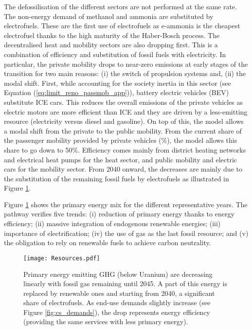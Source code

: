 The defossilisation of the different sectors are not performed at the same rate. The non-energy demand of methanol and ammonia are substituted by electrofuels. These are the first use of electrofuels as  e-ammonia is the cheapest electrofuel thanks to the high maturity of the Haber-Bosch process. The decentralised heat and mobility sectors are also dropping first. This is a combination of efficiency and substitution of fossil fuels with electricity. In particular, the private mobility drops to near-zero emissions at early stages of the transition for two main reasons: (i) the switch of propulsion systems and, (ii) the modal shift. First, while accounting for the society inertia in this sector (see Equation (\ref{eq:limit_reno_passmob_app})), battery electric vehicles (BEV) substitute \gls{ICE} cars. This reduces the overall emissions of the private vehicles as electric motors are more efficient than \gls{ICE} and they are driven by a less-emitting resource (\ie electricity versus diesel and gasoline). On top of this, the model allows a modal shift from the private to the public mobility. From the current share of the passenger mobility provided by private vehicles (\%), the model allows this share to go down to 50\%. Efficiency comes mainly from district heating networks and electrical heat pumps for the heat sector, and public mobility and electric cars for the mobility sector. From 2040 onward, the decreases are mainly due to the substitution of the remaining fossil fuels by electrofuels as illustrated in Figure \ref{fig:pestd_primary_energy}.

Figure \ref{fig:pestd_primary_energy} shows the primary energy mix for the different representative years. The pathway verifies five trends: (i) reduction of primary energy thanks to energy efficiency; (ii) massive integration of endogenous renewable energies; (iii) importance of electrification; (iv) the use of gas as the last fossil resource; and (v) the obligation to rely on renewable fuels to achieve carbon neutrality.

 \begin{figure}[!htbp]
\centering
\texttt{[image: Resources.pdf]}
\caption{Primary energy emitting \gls{GHG} (below Uranium) are decreasing linearly with fossil gas remaining until 2045. A part of this energy is replaced by renewable ones and starting from 2040, a significant share of electrofuels. As end-use demands slightly increase (see Figure \ref{fig:cs_demands}), the drop represents energy efficiency (\ie providing the same services with less primary energy).}
\label{fig:pestd_primary_energy}
\end{figure}

